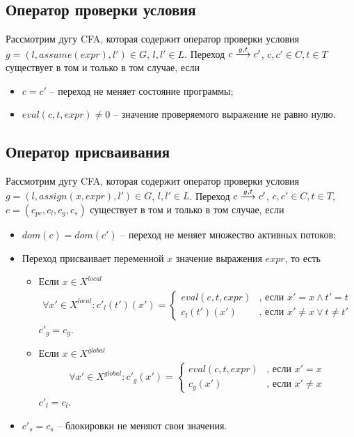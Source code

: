 \subsection{Оператор проверки условия}

Рассмотрим дугу CFA, которая содержит оператор проверки условия $g = (l, assume(expr), l') \in G$, $l, l' \in L$.
Переход $c \stackrel{g, t}{\longrightarrow} c'$, $c, c' \in C, t\in T$ существует в том и только в том случае, если
\begin{itemize}
\item $c = c'$ -- переход не меняет состояние программы;
\item $eval(c, t, expr) \neq 0$ -- значение проверяемого выражение не равно нулю.
\end{itemize}

\subsection{Оператор присваивания}

Рассмотрим дугу CFA, которая содержит оператор проверки условия $g = (l, assign(x, expr), l') \in G$, $l, l' \in L$.
Переход $c \stackrel{g, t}{\longrightarrow} c'$, $c, c' \in C, t\in T$, $c=(c_{pc}, c_l, c_g, c_s)$ существует в том и только в том случае, если
\begin{itemize}
\item $dom(c)=dom(c')$ -- переход не меняет множество активных потоков;
\item 
Переход присваивает переменной $x$ значение выражения $expr$, то есть
\begin{itemize}
\item Если $x \in X^{local}$
\begin{align*}
\forall x' \in X^{local}: c'_l(t')(x')=
\begin{cases}
eval(c, t, expr)& \text{, если $x' = x \land t' = t$} \\
c_l(t')(x') & \text{, если $x'\neq x \lor t \neq t'$}
\end{cases} 
\end{align*}
$c'_g = c_g$.

\item Если $x \in X^{global}$ 
\begin{align}
\forall x' \in X^{global}: c'_g(x')=
\begin{cases}
eval(c, t, expr)& \text{, если $x' = x$} \\
c_g(x') & \text{, если $x'\neq x$}
\end{cases} \nonumber
\end{align}
$c'_l = c_l$.
\end{itemize}

\item $c'_s = c_s$ -- блокировки не меняют свои значения.
\end{itemize}

